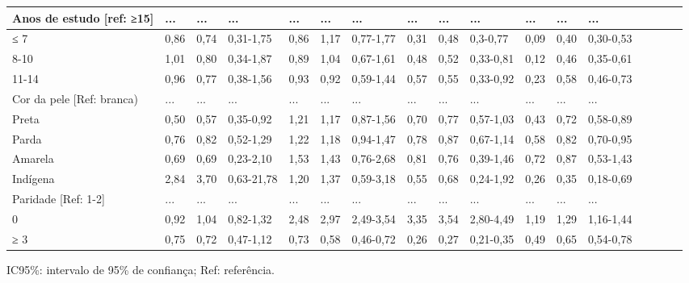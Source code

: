 \documentclass{article}
\begin{document}
\begin{table}
\begin{xtabular}{ l | l | l | l | l l | l | l | l | l | l | l | l | l | l | l |
l }
Anos de estudo [ref: ≥15]
& ...
& ...
& ...
& ...
& ...
& ...
& ...
& ...
& ...
& ...
& ...
& ...
\\ \hline

≤ 7
& 0,86
& 0,74
& 0,31-1,75
& 0,86
& 1,17
& 0,77-1,77
& 0,31
& 0,48
& 0,3-0,77
& 0,09
& 0,40
& 0,30-0,53
\\ \hline

8-10
& 1,01
& 0,80
& 0,34-1,87
& 0,89
& 1,04
& 0,67-1,61
& 0,48
& 0,52
& 0,33-0,81
& 0,12
& 0,46
& 0,35-0,61
\\ \hline

11-14
& 0,96
& 0,77
& 0,38-1,56
& 0,93
& 0,92
& 0,59-1,44
& 0,57
& 0,55
& 0,33-0,92
& 0,23
& 0,58
& 0,46-0,73
\\ \hline

Cor da pele [Ref: branca)
& ...
& ...
& ...
& ...
& ...
& ...
& ...
& ...
& ...
& ...
& ...
& ...
\\ \hline

Preta
& 0,50
& 0,57
& 0,35-0,92
& 1,21
& 1,17
& 0,87-1,56
& 0,70
& 0,77
& 0,57-1,03
& 0,43
& 0,72
& 0,58-0,89
\\ \hline

Parda
& 0,76
& 0,82
& 0,52-1,29
& 1,22
& 1,18
& 0,94-1,47
& 0,78
& 0,87
& 0,67-1,14
& 0,58
& 0,82
& 0,70-0,95
\\ \hline

Amarela
& 0,69
& 0,69
& 0,23-2,10
& 1,53
& 1,43
& 0,76-2,68
& 0,81
& 0,76
& 0,39-1,46
& 0,72
& 0,87
& 0,53-1,43
\\ \hline

Indígena
& 2,84
& 3,70
& 0,63-21,78
& 1,20
& 1,37
& 0,59-3,18
& 0,55
& 0,68
& 0,24-1,92
& 0,26
& 0,35
& 0,18-0,69
\\ \hline

Paridade [Ref: 1-2]
& ...
& ...
& ...
& ...
& ...
& ...
& ...
& ...
& ...
& ...
& ...
& ...
\\ \hline

0
& 0,92
& 1,04
& 0,82-1,32
& 2,48
& 2,97
& 2,49-3,54
& 3,35
& 3,54
& 2,80-4,49
& 1,19
& 1,29
& 1,16-1,44
\\ \hline

≥ 3
& 0,75
& 0,72
& 0,47-1,12
& 0,73
& 0,58
& 0,46-0,72
& 0,26
& 0,27
& 0,21-0,35
& 0,49
& 0,65
& 0,54-0,78
\\ \hline

\end{xtabular}
\end{table}

IC95\%: intervalo de 95\% de confiança; Ref: referência.
\end{document}
